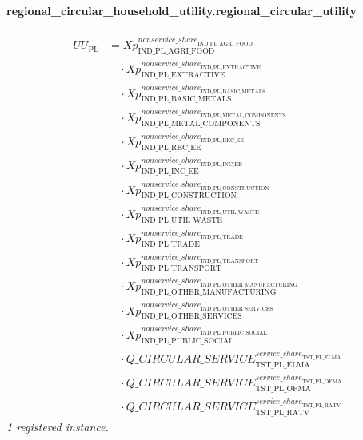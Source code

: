 \documentclass[11pt]{article}
\begin{document}
\paragraph{regional\_circular\_household\_utility.regional\_circular\_utility}
\begin{align*}
UU_{\text{PL}} &= Xp_{\text{IND\_PL\_AGRI\_FOOD}}^{{nonservice\_share}_{\text{IND\_PL\_AGRI\_FOOD}}}\\
&\quad {}\cdot Xp_{\text{IND\_PL\_EXTRACTIVE}}^{{nonservice\_share}_{\text{IND\_PL\_EXTRACTIVE}}}\\
&\quad {}\cdot Xp_{\text{IND\_PL\_BASIC\_METALS}}^{{nonservice\_share}_{\text{IND\_PL\_BASIC\_METALS}}}\\
&\quad {}\cdot Xp_{\text{IND\_PL\_METAL\_COMPONENTS}}^{{nonservice\_share}_{\text{IND\_PL\_METAL\_COMPONENTS}}}\\
&\quad {}\cdot Xp_{\text{IND\_PL\_REC\_EE}}^{{nonservice\_share}_{\text{IND\_PL\_REC\_EE}}}\\
&\quad {}\cdot Xp_{\text{IND\_PL\_INC\_EE}}^{{nonservice\_share}_{\text{IND\_PL\_INC\_EE}}}\\
&\quad {}\cdot Xp_{\text{IND\_PL\_CONSTRUCTION}}^{{nonservice\_share}_{\text{IND\_PL\_CONSTRUCTION}}}\\
&\quad {}\cdot Xp_{\text{IND\_PL\_UTIL\_WASTE}}^{{nonservice\_share}_{\text{IND\_PL\_UTIL\_WASTE}}}\\
&\quad {}\cdot Xp_{\text{IND\_PL\_TRADE}}^{{nonservice\_share}_{\text{IND\_PL\_TRADE}}}\\
&\quad {}\cdot Xp_{\text{IND\_PL\_TRANSPORT}}^{{nonservice\_share}_{\text{IND\_PL\_TRANSPORT}}}\\
&\quad {}\cdot Xp_{\text{IND\_PL\_OTHER\_MANUFACTURING}}^{{nonservice\_share}_{\text{IND\_PL\_OTHER\_MANUFACTURING}}}\\
&\quad {}\cdot Xp_{\text{IND\_PL\_OTHER\_SERVICES}}^{{nonservice\_share}_{\text{IND\_PL\_OTHER\_SERVICES}}}\\
&\quad {}\cdot Xp_{\text{IND\_PL\_PUBLIC\_SOCIAL}}^{{nonservice\_share}_{\text{IND\_PL\_PUBLIC\_SOCIAL}}}\\
&\quad {}\cdot {Q\_CIRCULAR\_SERVICE}_{\text{TST\_PL\_ELMA}}^{{service\_share}_{\text{TST\_PL\_ELMA}}}\\
&\quad {}\cdot {Q\_CIRCULAR\_SERVICE}_{\text{TST\_PL\_OFMA}}^{{service\_share}_{\text{TST\_PL\_OFMA}}}\\
&\quad {}\cdot {Q\_CIRCULAR\_SERVICE}_{\text{TST\_PL\_RATV}}^{{service\_share}_{\text{TST\_PL\_RATV}}}
\end{align*}
\noindent\emph{1 registered instance.}\par
\end{document}
